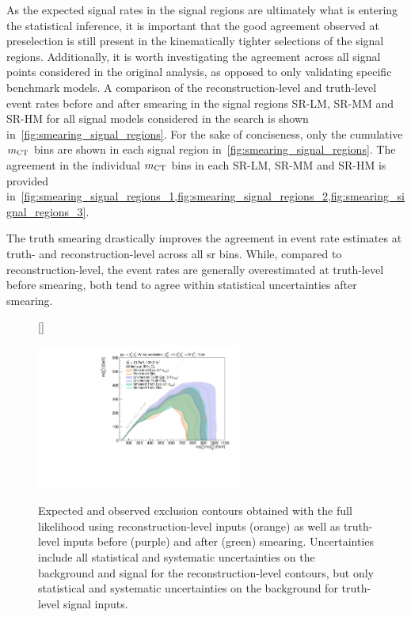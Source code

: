  As the expected signal rates in the signal regions are ultimately what is entering the statistical inference, it is important that the good agreement observed at preselection is still present in the kinematically tighter selections of the signal regions.
 Additionally, it is worth investigating the agreement across all signal points considered in the original analysis, as opposed to only validating specific benchmark models.
 A comparison of the reconstruction-level and truth-level event rates before and after smearing in the signal regions SR-LM, SR-MM and SR-HM for all signal models considered in the \onelepton search is shown in~\cref{fig:smearing_signal_regions}.
 For the sake of conciseness, only the cumulative $m_{\textrm{CT}}$ bins are shown in each signal region in~\cref{fig:smearing_signal_regions}.
 The agreement in the individual $m_{\textrm{CT}}$ bins in each SR-LM, SR-MM and SR-HM is provided in~\cref{fig:smearing_signal_regions_1,fig:smearing_signal_regions_2,fig:smearing_signal_regions_3}.
 
The truth smearing drastically improves the agreement in event rate estimates at truth- and reconstruction-level across all \gls{sr} bins.
While, compared to reconstruction-level, the event rates are generally overestimated at truth-level before smearing, both tend to agree within statistical uncertainties after smearing. 
 
\begin{figure}
[\FBwidth]
{\caption{Expected and observed exclusion contours obtained with the full likelihood using reconstruction-level inputs (orange) as well as truth-level inputs before (purple) and after (green) smearing. Uncertainties include all statistical and systematic uncertainties on the background and signal for the reconstruction-level contours, but only statistical and systematic uncertainties on the background for truth-level signal inputs.}\label{fig:simplified_likelihood_after_smearing}}
{\includegraphics[width=0.60\textwidth]{exclusion_1Lbb_truthInput_compareReco_BkgOnly_noLabel}}
\end{figure}
 
